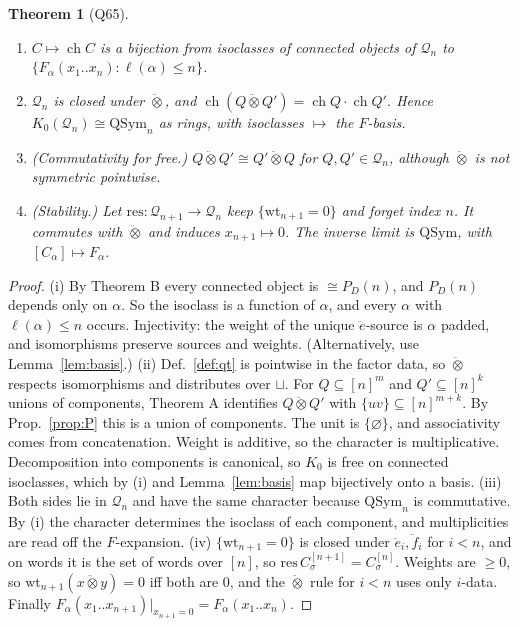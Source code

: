 \documentclass[11pt]{amsart}
\newtheorem{theorem}{Theorem}[section]
\theoremstyle{definition}
\theoremstyle{remark}
\newcommand{\ee}{\ddot e}
\newcommand{\ff}{\ddot f}
\newcommand{\qt}{\mathbin{\ddot\otimes}}
\newcommand{\wt}{\mathrm{wt}}
\newcommand{\QSym}{\mathrm{QSym}}
\newcommand{\cQ}{\mathcal{Q}}
\begin{document}
\begin{theorem}[Q65]\label{thm:Q65}
\begin{enumerate}[label=(\roman*)]
\item $C\mapsto\operatorname{ch}C$ is a bijection from isoclasses of connected objects of $\cQ_n$ to $\{F_\alpha(x_1..x_n):\ell(\alpha)\le n\}$.
\item $\cQ_n$ is closed under $\qt$, and $\operatorname{ch}(Q\qt Q')=\operatorname{ch}Q\cdot\operatorname{ch}Q'$. Hence $K_0(\cQ_n)\cong\QSym_n$ as rings, with isoclasses $\mapsto$ the $F$-basis.
\item (Commutativity for free.) $Q\qt Q'\cong Q'\qt Q$ for $Q,Q'\in\cQ_n$, although $\qt$ is not symmetric pointwise.
\item (Stability.) Let $\mathrm{res}:\cQ_{n+1}\to\cQ_n$ keep $\{\wt_{n+1}=0\}$ and forget index $n$. It commutes with $\qt$ and induces $x_{n+1}\mapsto0$. The inverse limit is $\QSym$, with $[C_\alpha]\mapsto F_\alpha$.
\end{enumerate}
\end{theorem}
\begin{proof}
(i) By Theorem B every connected object is $\cong P_D(n)$, and $P_D(n)$ depends only on $\alpha$. So the isoclass is a function of $\alpha$, and every $\alpha$ with $\ell(\alpha)\le n$ occurs. Injectivity: the weight of the unique $\ee$-source is $\alpha$ padded, and isomorphisms preserve sources and weights. (Alternatively, use Lemma~\ref{lem:basis}.)
(ii) Def.~\ref{def:qt} is pointwise in the factor data, so $\qt$ respects isomorphisms and distributes over $\sqcup$. For $Q\subseteq[n]^m$ and $Q'\subseteq[n]^k$ unions of components, Theorem A identifies $Q\qt Q'$ with $\{uv\}\subseteq[n]^{m+k}$. By Prop.~\ref{prop:P} this is a union of components. The unit is $\{\varnothing\}$, and associativity comes from concatenation. Weight is additive, so the character is multiplicative. Decomposition into components is canonical, so $K_0$ is free on connected isoclasses, which by (i) and Lemma~\ref{lem:basis} map bijectively onto a basis.
(iii) Both sides lie in $\cQ_n$ and have the same character because $\QSym_n$ is commutative. By (i) the character determines the isoclass of each component, and multiplicities are read off the $F$-expansion.
(iv) $\{\wt_{n+1}=0\}$ is closed under $\ee_i,\ff_i$ for $i<n$, and on words it is the set of words over $[n]$, so $\mathrm{res}\,C^{[n+1]}_\sigma=C^{[n]}_\sigma$. Weights are $\ge0$, so $\wt_{n+1}(x\qt y)=0$ iff both are $0$, and the $\qt$ rule for $i<n$ uses only $i$-data. Finally $F_\alpha(x_1..x_{n+1})|_{x_{n+1}=0}=F_\alpha(x_1..x_n)$.
\end{proof}
\end{document}
